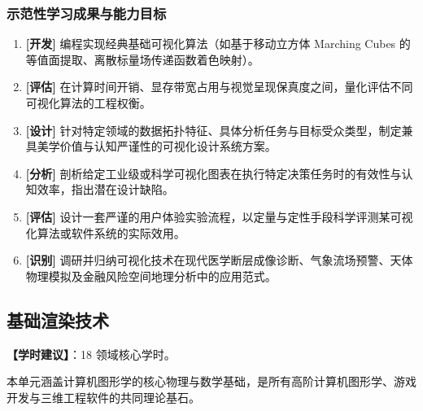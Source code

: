 \subsubsection{示范性学习成果与能力目标}
\begin{enumerate}
    \item \textbf{[开发]} 编程实现经典基础可视化算法（如基于移动立方体 Marching Cubes 的等值面提取、离散标量场传递函数着色映射）。
    \item \textbf{[评估]} 在计算时间开销、显存带宽占用与视觉呈现保真度之间，量化评估不同可视化算法的工程权衡。
    \item \textbf{[设计]} 针对特定领域的数据拓扑特征、具体分析任务与目标受众类型，制定兼具美学价值与认知严谨性的可视化设计系统方案。
    \item \textbf{[分析]} 剖析给定工业级或科学可视化图表在执行特定决策任务时的有效性与认知效率，指出潜在设计缺陷。
    \item \textbf{[评估]} 设计一套严谨的用户体验实验流程，以定量与定性手段科学评测某可视化算法或软件系统的实际效用。
    \item \textbf{[识别]} 调研并归纳可视化技术在现代医学断层成像诊断、气象流场预警、天体物理模拟及金融风险空间地理分析中的应用范式。
\end{enumerate}

\subsection{基础渲染技术}
\textbf{【学时建议】}：18 领域核心学时。

本单元涵盖计算机图形学的核心物理与数学基础，是所有高阶计算机图形学、游戏开发与三维工程软件的共同理论基石。

